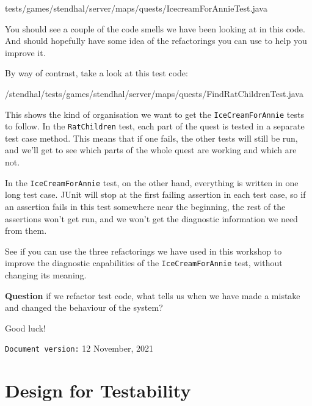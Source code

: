 \documentclass[
]{book}
\newenvironment{Shaded}{\begin{snugshade}}{\end{snugshade}}
\newcommand{\FunctionTok}[1]{\textcolor[rgb]{0.00,0.00,0.00}{#1}}
\newcommand{\NormalTok}[1]{#1}
\begin{document}
\begin{Shaded}
\begin{Highlighting}[]
\NormalTok{tests/games/stendhal/server/maps/quests/IcecreamForAnnieTest.}\FunctionTok{java}
\end{Highlighting}
\end{Shaded}

You should see a couple of the code smells we have been looking at in this code. And should hopefully have some idea of the refactorings you can use to help you improve it.

By way of contrast, take a look at this test code:

\begin{Shaded}
\begin{Highlighting}[]
\NormalTok{/stendhal/tests/games/stendhal/server/maps/quests/FindRatChildrenTest.}\FunctionTok{java}
\end{Highlighting}
\end{Shaded}

This shows the kind of organisation we want to get the \texttt{IceCreamForAnnie} tests to follow. In the \texttt{RatChildren} test, each part of the quest is tested in a separate test case method. This means that if one fails, the other tests will still be run, and we'll get to see which parts of the whole quest are working and which are not.

In the \texttt{IceCreamForAnnie} test, on the other hand, everything is written in one long test case. JUnit will stop at the first failing assertion in each test case, so if an assertion fails in this test somewhere near the beginning, the rest of the assertions won't get run, and we won't get the diagnostic information we need from them.

See if you can use the three refactorings we have used in this workshop to improve the diagnostic capabilities of the \texttt{IceCreamForAnnie} test, without changing its meaning.

\textbf{Question} if we refactor test code, what tells us when we have made a mistake and changed the behaviour of the system?

Good luck!

\texttt{Document\ version:} 12 November, 2021

\hypertarget{designing}{%
\chapter{Design for Testability}\label{designing}}
\end{document}
